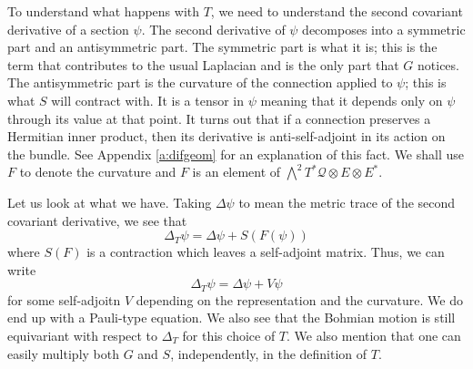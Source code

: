 \documentclass[11pt]{article}
\theoremstyle{remark}
\begin{document}
To understand what happens with $T$, we need to understand the second
covariant derivative of a section $\ensuremath{\psi}$. 
The second derivative of $\ensuremath{\psi}$ decomposes into a symmetric part and an
antisymmetric part. The symmetric part is what it is; this is the term
that contributes to the usual Laplacian and is the only part that $G$ notices.
The antisymmetric part is the curvature of the
connection applied to $\ensuremath{\psi}$; this is what $S$ will contract with. 
It is a tensor in $\ensuremath{\psi}$ meaning that it
depends only on $\ensuremath{\psi}$ through its value at that point. It turns out
that if a connection preserves a Hermitian inner product, then its
derivative is anti-self-adjoint in its action on the bundle. See
Appendix \ref{a:difgeom} for an explanation of this fact. We shall use
$F$ to denote the curvature and
 $F$ is an element of $\ensuremath{\bigwedge^{2}{\ensuremath{T^{*} \ensuremath{\mathcal{Q}}}}} \otimes E \otimes
\ensuremath{{E}^{*}}$. 

Let us look at what we have. Taking $\ensuremath{\Delta} \ensuremath{\psi}$ to mean
the metric trace of the second covariant derivative, we see that 
\[
\ensuremath{\Delta}_T \ensuremath{\psi} = \ensuremath{\Delta} \ensuremath{\psi} + \ensuremath{S}(F(\ensuremath{\psi})) 
\]
where $\ensuremath{S}(F)$ is a contraction which leaves a self-adjoint
matrix. Thus, we can write 
\[
\ensuremath{\Delta}_T \ensuremath{\psi} = \ensuremath{\Delta} \ensuremath{\psi} + V \ensuremath{\psi}
\]
for some self-adjoitn $V$ depending on the representation and the
curvature. We do end up with a Pauli-type equation. We also see that
the Bohmian motion is still equivariant with respect to $\ensuremath{\Delta}_T$ for
this choice of $T$. We also mention that one can easily multiply both
$G$ and $S$, independently, in the definition of $T$.  
\end{document}
